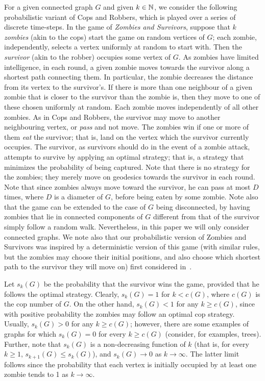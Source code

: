 \documentclass[12pt]{amsart}
\begin{document}
For a given connected graph $G$ and given $k \in {\mathbb N}$, we consider the following probabilistic variant of Cops and Robbers, which is played over a series of discrete time-steps. In the game of \emph{Zombies and
Survivors}, suppose that $k$ \emph{zombies} (akin to the cops) start the game on random vertices of $G$; each zombie, independently, selects a vertex uniformly at
random to start with. Then the \emph{survivor} (akin to the robber) occupies some vertex of $G$. As zombies have limited intelligence, in each round, a given zombie moves towards the survivor along a
shortest path connecting them. In particular, the zombie decreases the distance from its vertex to the survivor's. If there is more than one neighbour of a given zombie that is closer to the survivor
than the zombie is, then they move to one of these chosen uniformly at random. Each zombie moves independently of all other zombies. As in Cops and Robbers, the survivor may move to another
neighbouring vertex, or \emph{pass} and not move. The zombies win if one or more of them \emph{eat} the survivor; that is, land on the vertex which the survivor currently occupies. The survivor, as survivors should do in the event of a zombie attack, attempts to survive by applying an optimal strategy; that is, a strategy that minimizes the probability of being captured. Note that there is no strategy for the zombies; they merely move on
geodesics towards the survivor in each round. Note that since zombies always move toward the survivor, he can pass at most $D$ times, where $D$ is a diameter of $G$, before being eaten by some zombie.
Note also that the game can be extended to the case of $G$ being disconnected, by having zombies that lie in connected components of $G$ different from that of the survivor simply follow a random walk. Nevertheless, in this paper we will only consider connected graphs. We note also that our probabilistic version of Zombies and Survivors was inspired by a deterministic version of this game (with similar rules, but the zombies may choose their initial positions, and also choose which shortest path to the survivor they will move on) first considered in~\cite{hm}.

\bigskip

Let $s_k(G)$ be the probability that the survivor wins the game, provided that he follows the optimal strategy. Clearly, $s_k(G)=1$ for $k < c(G)$, where $c(G)$ is the cop number of $G$.
On the other hand, $s_k(G) < 1$ for any $k \ge c(G)$, since with positive probability the zombies may follow an optimal cop strategy. Usually, $s_k(G) > 0$ for any $k \ge c(G)$; however, there are some examples of graphs for which $s_k(G) = 0$ for every $k \ge c(G)$ (consider, for examples, trees).
Further, note that $s_k(G)$ is a non-decreasing function of $k$ (that is, for every $k \ge 1$, $s_{k+1}(G) \le s_k(G)$), and $s_k(G) \to 0$ as $k\to \infty$. The latter limit follows since the probability that each vertex is initially occupied by at least one zombie tends to 1 as $k \to \infty$.
\end{document}
